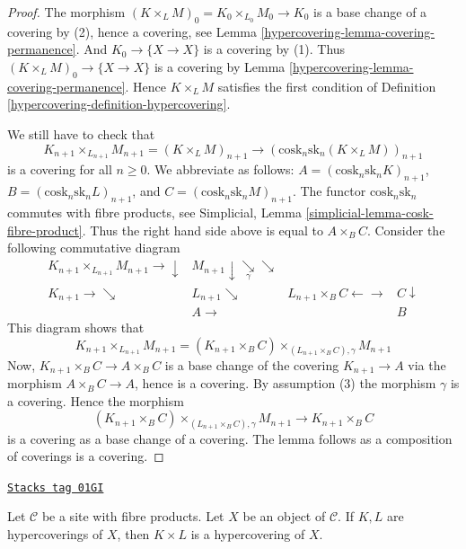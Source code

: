 \begin{proof}

The morphism $(K \times_L M)_0 = K_0 \times_{L_0} M_0 \to K_0$
is a base change of a covering by (2), hence a covering, see
Lemma \ref{hypercovering-lemma-covering-permanence}. And $K_0 \to \{X \to X\}$
is a covering by (1). Thus $(K \times_L M)_0 \to \{X \to X\}$
is a covering by Lemma \ref{hypercovering-lemma-covering-permanence}. Hence
$K \times_L M$ satisfies the first condition of Definition
\ref{hypercovering-definition-hypercovering}.

\medskip\noindent
We still have to check that
$$
K_{n + 1} \times_{L_{n + 1}} M_{n + 1} = (K \times_L M)_{n + 1}
\longrightarrow
(\text{cosk}_n \text{sk}_n (K \times_L M))_{n + 1}
$$
is a covering for all $n \geq 0$. We abbreviate as follows:
$A = (\text{cosk}_n \text{sk}_n K)_{n + 1}$,
$B = (\text{cosk}_n \text{sk}_n L)_{n + 1}$, and
$C = (\text{cosk}_n \text{sk}_n M)_{n + 1}$.
The functor $\text{cosk}_n \text{sk}_n$ commutes with fibre products,
see Simplicial, Lemma \ref{simplicial-lemma-cosk-fibre-product}.
Thus the right hand side above is equal to $A \times_B C$.
Consider the following commutative diagram
$$
\begin{array}{cccc}K_{n + 1} \times_{L_{n + 1}} M_{n + 1} \longrightarrow\downarrow & M_{n + 1} \downarrow\underset{\gamma}{\searrow}\searrow &  &  \\ K_{n + 1} \longrightarrow\searrow & L_{n + 1} \searrow & L_{n + 1} \times_B C \longleftarrow\longrightarrow & C \downarrow \\  & A \longrightarrow &  & B\end{array}
$$
This diagram shows that
$$
K_{n + 1} \times_{L_{n + 1}} M_{n + 1}
=
(K_{n + 1} \times_B C)
\times_{(L_{n + 1} \times_B C), \gamma}
M_{n + 1}
$$
Now, $K_{n + 1} \times_B C \to A \times_B C$
is a base change of the covering $K_{n + 1} \to A$
via the morphism $A \times_B C \to A$, hence is a
covering. By assumption (3) the morphism $\gamma$ is a covering.
Hence the morphism
$$
(K_{n + 1} \times_B C)
\times_{(L_{n + 1} \times_B C), \gamma}
M_{n + 1}
\longrightarrow
K_{n + 1} \times_B C
$$
is a covering as a base change of a covering.
The lemma follows as a composition of coverings
is a covering.
\end{proof}

\begin{lemma}
\label{hypercovering-lemma-product-hypercoverings}
\href{https://stacks.math.columbia.edu/tag/01GI}{\texttt{Stacks tag 01GI}}

Let $\mathcal{C}$ be a site with fibre products.
Let $X$ be an object of $\mathcal{C}$.
If $K, L$ are hypercoverings of $X$, then
$K \times L$ is a hypercovering of $X$.
\end{lemma}

